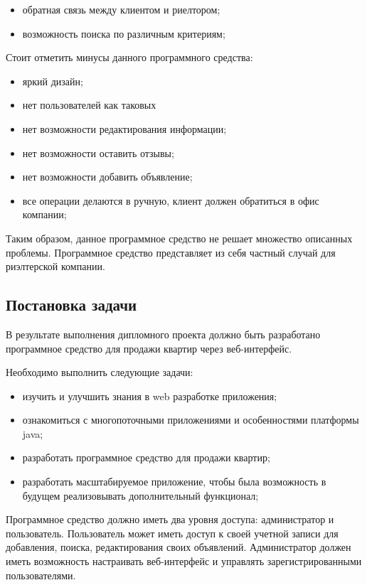 \begin{itemize}
	\item обратная связь между клиентом и риелтором;
	\item возможность поиска по различным критериям;
\end{itemize}

Стоит отметить минусы данного программного средства:

\begin{itemize}
	\item яркий дизайн;
	\item нет пользователей как таковых
	\item нет возможности редактирования информации;
	\item нет возможности оставить отзывы;
	\item нет возможности добавить объявление;
	\item все операции делаются в ручную, клиент должен обратиться в офис компании;
\end{itemize}

Таким образом, данное программное средство не решает  множество описанных проблемы. Программное средство представляет из себя частный случай для риэлтерской компании.

\subsection{Постановка задачи}
В результате выполнения дипломного проекта должно быть разработано программное средство для продажи квартир через веб-интерфейс. 

Необходимо выполнить следующие задачи:

\begin{itemize}
	\item изучить и улучшить знания в web разработке приложения;
	\item ознакомиться с многопоточными приложениями и особенностями платформы java;
	\item разработать программное средство для продажи квартир; 
	\item разработать масштабируемое приложение, чтобы была возможность в будущем реализовывать дополнительный функционал;
\end{itemize}

Программное средство должно иметь два уровня доступа: администратор и пользователь. Пользователь может иметь доступ к своей учетной записи для добавления, поиска, редактирования своих объявлений. Администратор должен иметь возможность настраивать веб-интерфейс и управлять зарегистрированными пользователями.

